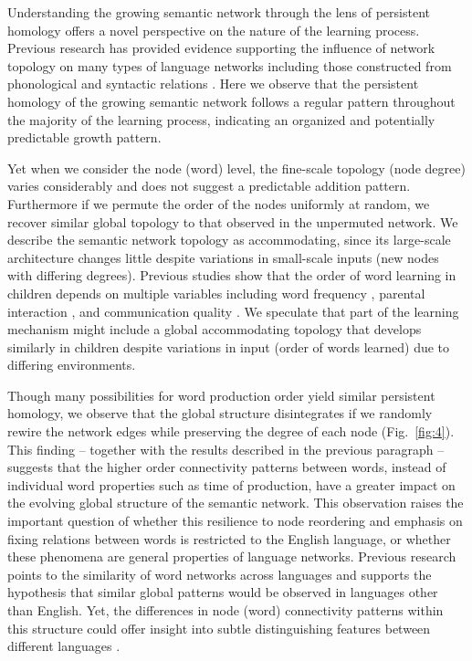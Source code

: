 \documentclass{article}
\begin{document}
Understanding the growing semantic network through the lens of persistent homology offers a novel perspective on the nature of the learning process. Previous research has provided evidence supporting the influence of network topology on many types of language networks including those constructed from phonological \cite{arbesman2010structure,siew2013community} and syntactic relations \cite{corominas2009ontogeny,vcech2009word}. Here we observe that the persistent homology of the growing semantic network follows a regular pattern throughout the majority of the learning process, indicating an organized and potentially predictable growth pattern.

Yet when we consider the node (word) level, the fine-scale topology (node degree) varies considerably and does not suggest a predictable addition pattern. Furthermore if we permute the order of the nodes uniformly at random, we recover similar global topology to that observed in the unpermuted network. We describe the semantic network topology as accommodating, since its large-scale architecture changes little despite variations in small-scale inputs (new nodes with differing degrees). Previous studies show that the order of word learning in children depends on multiple variables including word frequency \cite{brent2001role,huttenlocher1991early}, parental interaction \cite{hart1995meaningful}, and communication quality \cite{hirsh2015contribution}. We speculate that part of the learning mechanism might include a global accommodating topology that develops similarly in children despite variations in input (order of words learned) due to differing environments.

Though many possibilities for word production order yield similar persistent homology, we observe that the global structure disintegrates if we randomly rewire the network edges while preserving the degree of each node (Fig.~\ref{fig:4}). This finding -- together with the results described in the previous paragraph -- suggests that the higher order connectivity patterns between words, instead of individual word properties such as time of production, have a greater impact on the evolving global structure of the semantic network. This observation raises the important question of whether this resilience to node reordering and emphasis on fixing relations between words is restricted to the English language, or whether these phenomena are general properties of language networks. Previous research points to the similarity of word networks across languages \cite{youn2016universal} and supports the hypothesis that similar global patterns would be observed in languages other than English. Yet, the differences in node (word) connectivity patterns within this structure could offer insight into subtle distinguishing features between different languages \cite{goddard2008cross}.
\end{document}
